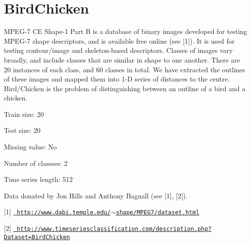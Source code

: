 \chapter{Bird\+Chicken}
\hypertarget{md_external_2data_2UCRArchive__2018_2BirdChicken_2README}{}\label{md_external_2data_2UCRArchive__2018_2BirdChicken_2README}
\label{md_external_2data_2UCRArchive__2018_2BirdChicken_2README_autotoc_md23}%
%
 MPEG-\/7 CE Shape-\/1 Part B is a database of binary images developed for testing MPEG-\/7 shape descriptors, and is available free online (see \mbox{[}1\mbox{]}). It is used for testing contour/image and skeleton-\/based descriptors. Classes of images vary broadly, and include classes that are similar in shape to one another. There are 20 instances of each class, and 60 classes in total. We have extracted the outlines of these images and mapped them into 1-\/D series of distances to the centre. Bird/\+Chicken is the problem of distinguishing between an outline of a bird and a chicken.

Train size\+: 20

Test size\+: 20

Missing value\+: No

Number of classses\+: 2

Time series length\+: 512

Data donated by Jon Hills and Anthony Bagnall (see \mbox{[}1\mbox{]}, \mbox{[}2\mbox{]}).

\mbox{[}1\mbox{]} \href{http://www.dabi.temple.edu/~shape/MPEG7/dataset.html}{\texttt{ http\+://www.\+dabi.\+temple.\+edu/\texorpdfstring{$\sim$}{\string~}shape/\+MPEG7/dataset.\+html}}

\mbox{[}2\mbox{]} \href{http://www.timeseriesclassification.com/description.php?Dataset=BirdChicken}{\texttt{ http\+://www.\+timeseriesclassification.\+com/description.\+php?\+Dataset=\+Bird\+Chicken}} 